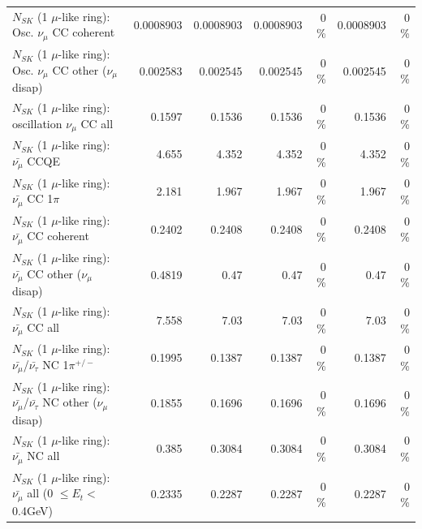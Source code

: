 \begin{table}
\begin{tabular}{| l | r | r | r  r | r  r |}
                        $N_{SK}$ (1 $\mu$-like ring): Osc. $\nu_\mu$ CC coherent &       0.0008903 &       0.0008903 &       0.0008903 &        0 \%  &       0.0008903 &        0 \%  \\ 
         $N_{SK}$ (1 $\mu$-like ring): Osc. $\nu_\mu$ CC other ($\nu_\mu$ disap) &        0.002583 &        0.002545 &        0.002545 &        0 \%  &        0.002545 &        0 \%  \\ 
                      $N_{SK}$ (1 $\mu$-like ring): oscillation $\nu_\mu$ CC all &          0.1597 &          0.1536 &          0.1536 &        0 \%  &          0.1536 &        0 \%  \\ 
\hline
\hline
                              $N_{SK}$ (1 $\mu$-like ring): $\bar{\nu_\mu}$ CCQE &           4.655 &           4.352 &           4.352 &        0 \%  &           4.352 &        0 \%  \\ 
                         $N_{SK}$ (1 $\mu$-like ring): $\bar{\nu_\mu}$ CC 1$\pi$ &           2.181 &           1.967 &           1.967 &        0 \%  &           1.967 &        0 \%  \\ 
                       $N_{SK}$ (1 $\mu$-like ring): $\bar{\nu_\mu}$ CC coherent &          0.2402 &          0.2408 &          0.2408 &        0 \%  &          0.2408 &        0 \%  \\ 
        $N_{SK}$ (1 $\mu$-like ring): $\bar{\nu_\mu}$ CC other ($\nu_\mu$ disap) &          0.4819 &            0.47 &            0.47 &        0 \%  &            0.47 &        0 \%  \\ 
                          $N_{SK}$ (1 $\mu$-like ring): $\bar{\nu_{\mu}}$ CC all &           7.558 &            7.03 &            7.03 &        0 \%  &            7.03 &        0 \%  \\ 
\hline
  $N_{SK}$ (1 $\mu$-like ring): $\bar{\nu_\mu}$/$\bar{\nu_\tau}$ NC 1$\pi^{+/-}$ &          0.1995 &          0.1387 &          0.1387 &        0 \%  &          0.1387 &        0 \%  \\ 
$N_{SK}$ (1 $\mu$-like ring): $\bar{\nu_\mu}$/$\bar{\nu_\tau}$ NC other ($\nu_\mu$ disap) &          0.1855 &          0.1696 &          0.1696 &        0 \%  &          0.1696 &        0 \%  \\ 
                          $N_{SK}$ (1 $\mu$-like ring): $\bar{\nu_{\mu}}$ NC all &           0.385 &          0.3084 &          0.3084 &        0 \%  &          0.3084 &        0 \%  \\ 
\hline
   $N_{SK}$ (1 $\mu$-like ring): $\bar{\nu_{\mu}}$ all (0 $\leq E_{t} <$ 0.4GeV) &          0.2335 &          0.2287 &          0.2287 &        0 \%  &          0.2287 &        0 \%  \\ 

\end{tabular}
\end{table}
